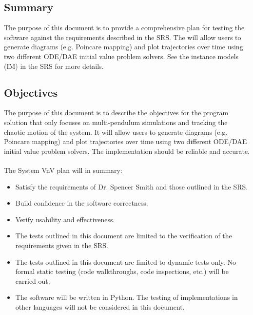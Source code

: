 \documentclass[12pt, titlepage]{article}
\begin{document}
\subsection{Summary}

The purpose of this document is to provide a comprehensive plan for testing the 
\progname software against the requirements described in the
\progname SRS. 
The \progname will allow users to generate diagrams (e.g. Poincare
mapping)
and plot trajectories over time using two different ODE/DAE initial value
problem solvers. See the instance models (IM) in the SRS for more details.


\subsection{Objectives}
The purpose of this document is to describe the objectives for the
\progname program solution that
only focuses on multi-pendulum simulations and tracking the chaotic
motion of the system. It will allow users to generate diagrams (e.g. Poincare
mapping) and plot trajectories over time using two different ODE/DAE initial value
problem solvers. The implementation should be reliable and accurate.\\\\
The System VnV plan will in summary:
\begin{itemize}
\item Satisfy the requirements of Dr. Spencer Smith and those
  outlined in the SRS.
\item Build confidence in the software correctness.
\item Verify usability and effectiveness.
\item The tests outlined in this document are limited to the verification of the 
  requirements given in the \progname SRS.
\item The tests outlined in this document are limited to dynamic tests only.  
  No formal static testing (code walkthroughs, code inspections, etc.) will be carried out.
\item The \progname software will be written in Python. The testing of 
implementations in other languages will not be considered in this document.
\end{itemize}
\end{document}
